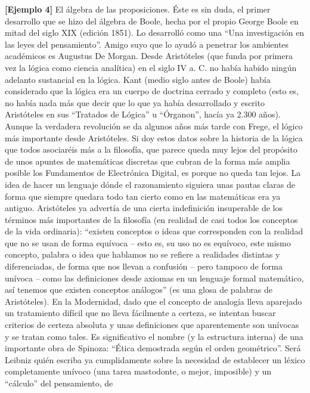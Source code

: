 \begin{enumerate}
  \textbf{{[}Ejemplo 4{]}} El álgebra de las proposiciones. Éste es sin
  duda, el primer desarrollo que se hizo del álgebra de Boole, hecha por
  el propio George Boole en mitad del siglo XIX (edición 1851). Lo
  desarrolló como una ``Una investigación en las leyes del
  pensamiento''. Amigo suyo que lo ayudó a penetrar los ambientes
  académi\-cos es Augustus De Morgan. Desde Aristóteles (que funda por
  primera vez la ló\-gica como ciencia analítica) en el siglo IV a. C.
  no había habido ningún adelanto sustancial en la lógica. Kant (medio
  siglo antes de Boole) había considerado que la lógica era un cuerpo de
  doctrina cerrado y completo (esto es, no había nada más que decir que
  lo que ya había desarrollado y escrito Aristóteles en sus ``Tra\-tados
  de Lógica'' u ``Órganon'', hacía ya 2.300 años). Aunque la verdadera
  revolu\-ción se da algunos años más tarde con Frege, el lógico más
  importante desde Aristóteles. Si doy estos datos sobre la historia de
  la lógica que todos asociaréis más a la filosofía, que parece queda
  muy lejos del propósito de unos apuntes de matemáticas discretas que
  cubran de la forma más amplia posible los Fundamentos de Electró\-nica
  Digital, es porque no queda tan lejos. La idea de hacer un len\-guaje
  dónde el razonamiento siguiera unas pautas claras de forma que siempre
  quedara todo tan cierto como en las matemáticas era ya antiguo.
  Aristóteles ya advertía de una cierta indefinición insuperable de los
  términos más importantes de la filosofía (en realidad de casi todos
  los conceptos de la vida ordinaria): ``exis\-ten conceptos o ideas que
  corresponden con la realidad que no se usan de forma equívoca -- esto
  es, su uso no es equívoco, este mismo concepto, palabra o idea que
  hablamos no se refiere a realidades distintas y diferenciadas, de
  forma que nos llevan a confusión -- pero tampoco de forma unívoca --
  como las definiciones desde axiomas en un lenguaje formal matemático,
  así tenemos que existen con\-ceptos análogos'' (es una glosa de
  palabras de Aristóteles). En la Modernidad, dado que el concepto de
  analogía lleva aparejado un tratamiento difícil que no lleva
  fácilmente a certeza, se intentan buscar criterios de certeza absoluta
  y unas definiciones que aparentemente son unívocas y se tratan como
  tales. Es significativo el nombre (y la estructura interna) de una
  importante obra de Spino\-za: ``Ética demostrada según el orden
  geométrico''. Será Leibniz quién escriba ya cumplidamente sobre la
  necesidad de establecer un léxico completamente unívoco (una tarea
  mastodonte, o mejor, imposible) y un ``cálculo'' del pensamiento, de

\end{enumerate}
